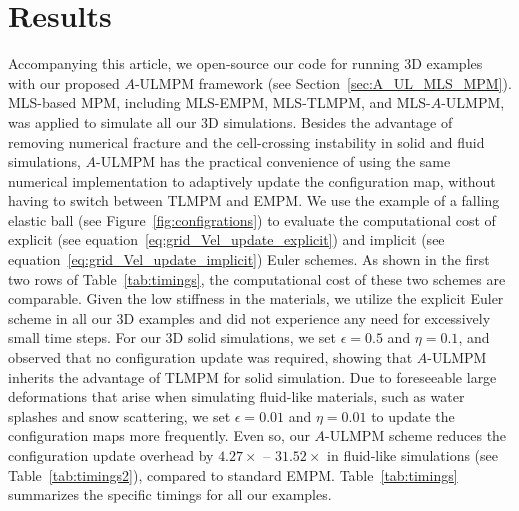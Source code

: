 \section{Results}
\label{sec:result}

Accompanying this article, we open-source our code for running 3D examples with our proposed $A$-ULMPM framework (see Section~\ref{sec:A_UL_MLS_MPM}). MLS-based MPM, including MLS-EMPM, MLS-TLMPM, and MLS-$A$-ULMPM, was applied to simulate all our 3D simulations. 
Besides the advantage of removing numerical fracture and the cell-crossing instability in solid and fluid simulations, $A$-ULMPM has the practical convenience of using the same numerical implementation to adaptively update the configuration map, without having to switch between TLMPM and EMPM.
We use the example of a falling elastic ball (see Figure~\ref{fig:configrations}) to evaluate the computational cost of explicit (see equation~\eqref{eq:grid_Vel_update_explicit}) and implicit (see equation~\eqref{eq:grid_Vel_update_implicit}) Euler schemes. 
As shown in the first two rows of Table~\ref{tab:timings}, the computational cost of these two schemes are comparable. 
Given the low stiffness in the materials, we utilize the explicit Euler scheme in all our 3D examples and did not experience any need for excessively small time steps.  
For our 3D solid simulations, we set $\epsilon=0.5$ and $\eta=0.1$, and observed that no configuration update was required, showing that $A$-ULMPM inherits the advantage of TLMPM for solid simulation. 
Due to foreseeable large deformations that arise when simulating fluid-like materials, such as water splashes and snow scattering, we set $\epsilon=0.01$ and $\eta=0.01$ to update the configuration maps more frequently. 
Even so, our $A$-ULMPM scheme reduces the configuration update overhead by $4.27\times$ -- $31.52\times$ in fluid-like simulations (see Table~\ref{tab:timings2}), compared to  standard EMPM. 
Table~\ref{tab:timings} summarizes the specific timings for all our examples. 

